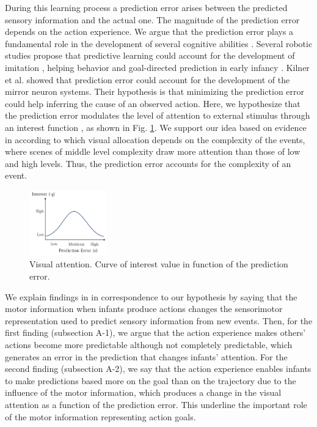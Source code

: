\documentclass[conference]{IEEEtran}
\begin{document}
During this learning process a prediction error arises between the predicted sensory information and the actual one. The magnitude of the prediction error depends on the action experience. We argue that the prediction error plays a fundamental role in the development of several cognitive abilities \cite{nagai2015}. Several robotic studies propose that predictive learning could account for the development of imitation \cite{minato2010model}, helping behavior \cite{baraglia2014prediction} and goal-directed prediction in early infancy \cite{copete2014development}. Kilner et al. \cite{kilner2007predictive} showed that prediction error could account for the development of the mirror neuron systems. Their hypothesis is that minimizing the prediction error could help inferring the cause of an observed action. Here, we hypothesize that the prediction error modulates the level of attention to external stimulus through an interest function  \cite{nagai2015}, as shown in Fig. \ref{Attention}. We support our idea based on evidence in \cite{kidd2012goldilocks} according to which visual allocation depends on the complexity of the events, where scenes of middle level complexity draw more attention than those of low and high levels. Thus, the prediction error accounts for the complexity of an event.

\begin{figure}[!t]
\centering
\includegraphics[width=0.3\textwidth,natwidth=700,natheight=450]{Figure5.png}
\caption{Visual attention. Curve of interest value in function of the prediction error.}
\label{Attention}
\end{figure}

We explain findings in \cite{sommerville2005action} in correspondence to our hypothesis by saying that the motor information when infants produce actions changes the sensorimotor representation used to predict sensory information from new events. Then, for the first finding (subsection A-1), we argue that the action experience makes others' actions become more predictable although not completely predictable, which generates an error in the prediction that changes infants' attention. For the second finding (subsection A-2), we say that the action experience enables infants to make predictions based more on the goal than on the trajectory due to the influence of the motor information, which produces a change in the visual attention as a function of the prediction error. This underline the important role of the motor information representing action goals.
\end{document}
